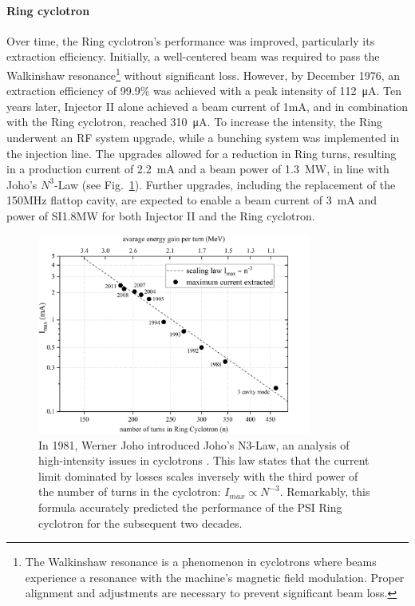 \begin{refsection}
        \paragraph{Ring cyclotron}
        Over time, the Ring cyclotron's performance was improved, particularly its extraction efficiency. 
        Initially, a well-centered beam was required to pass the Walkinshaw resonance\footnote{The Walkinshaw resonance is a phenomenon in cyclotrons where beams experience a resonance with the machine's magnetic field modulation. Proper alignment and adjustments are necessary to prevent significant beam loss.} without significant loss.
        However, by December 1976, an extraction efficiency of 99.9\% was achieved with a peak intensity of \SI{112}{\micro A}. 
        Ten years later, Injector II alone achieved a beam current of 1mA, and in combination with the Ring cyclotron, reached \SI{310}{\micro A}.
        To increase the intensity, the Ring underwent an RF system upgrade, while a bunching system was implemented in the injection line. 
        The upgrades allowed for a reduction in Ring turns, resulting in a production current of \SI{2.2}{mA} and a beam power of \SI{1.3}{MW}, in line with Joho's $N^3$-Law (see Fig.~\ref{fig:PSI:HIPA:joho}). 
        Further upgrades, including the replacement of the 150MHz flattop cavity, are expected to enable a beam current of \SI{3}{mA} and power of SI{1.8}{MW} for both Injector II and the Ring cyclotron.
        \begin{figure}
            \centering
            \includegraphics[width = 0.8\textwidth]{Figures/Introduction/PSI_HIPA_joho.png}
            \caption[John's N3-Law for maximum current in a cyclotron]{In 1981, Werner Joho introduced Joho's N3-Law, an analysis of high-intensity issues in cyclotrons \cite{joho}. This law states that the current limit dominated by losses scales inversely with the third power of the number of turns in the cyclotron: $I_{max}\propto N^{-3}$. Remarkably, this formula accurately predicted the performance of the PSI Ring cyclotron for the subsequent two decades.}
            \label{fig:PSI:HIPA:joho}
        \end{figure}
        

\end{refsection}
